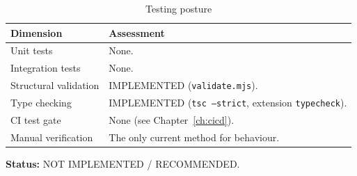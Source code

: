 \begin{table}[H]
\centering
\caption{Testing posture}
\begin{tabular}{p{4.4cm}p{9.8cm}}
\toprule
\textbf{Dimension} & \textbf{Assessment} \\
\midrule
Unit tests & None. \\
Integration tests & None. \\
Structural validation & IMPLEMENTED (\texttt{validate.mjs}). \\
Type checking & IMPLEMENTED (\texttt{tsc --strict}, extension \texttt{typecheck}). \\
CI test gate & None (see Chapter~\ref{ch:cicd}). \\
Manual verification & The only current method for behaviour. \\
\bottomrule
\end{tabular}
\end{table}

\textbf{Status:} NOT IMPLEMENTED / RECOMMENDED.
